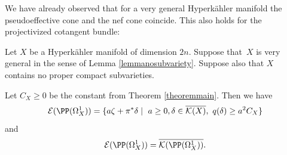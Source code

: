 We have already observed that for a very general Hyperkähler manifold
the pseudoeffective cone and the nef cone coincide.
This also holds for the projectivized cotangent bundle:

\begin{proposition} \label{propositionpseffcone}
Let $X$ be a Hyperkähler manifold of dimension $2n$. Suppose that~$X$ is very general in the sense of Lemma \ref{lemmanosubvariety}.
Suppose also that
$X$ contains no proper compact subvarieties.

Let $C_X \geq 0$ be the constant from Theorem \ref{theoremmain}.
Then we have
\begin{equation} \label{formulapseffcone}
\mathcal{E}(\PP(\Omega_X^1))=\{ a\zeta+\pi^* \delta \mid\ a\geq 0, \delta\in \overline{\mathcal{K}(X)},\ q(\delta)\geq a^2 C_X \}
\end{equation}
and 
\[
\mathcal{E}(\PP(\Omega_X^1))=\overline{\mathcal{K}(\PP(\Omega_X^1))}.
\]
\end{proposition}

